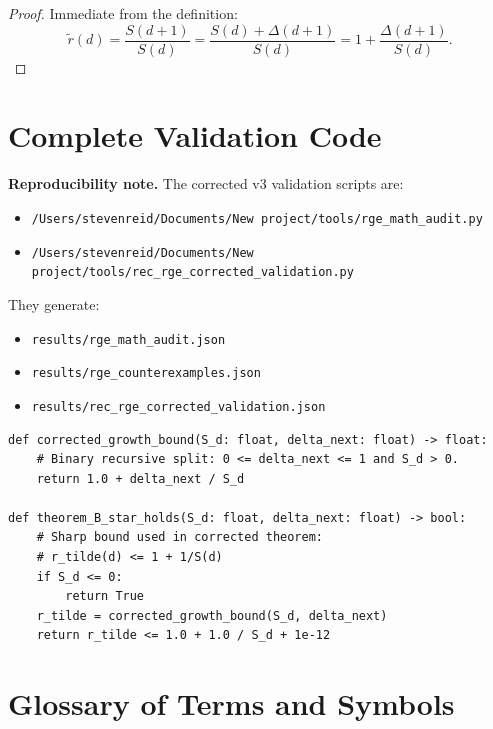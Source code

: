 \documentclass[11pt,a4paper]{article}
\theoremstyle{definition}
\theoremstyle{remark}
\newcommand{\rtilde}{\tilde{r}}
\begin{document}
\begin{proof}
Immediate from the definition:
\begin{equation}
    \rtilde(d)=\frac{S(d+1)}{S(d)}=\frac{S(d)+\Delta(d+1)}{S(d)}
    =1+\frac{\Delta(d+1)}{S(d)}.
\end{equation}
\end{proof}

\section{Complete Validation Code}
\label{app:code}

\noindent\textbf{Reproducibility note.} The corrected v3 validation scripts are:
\begin{itemize}[nosep]
    \item \texttt{/Users/stevenreid/Documents/New project/tools/rge\_math\_audit.py}
    \item \texttt{/Users/stevenreid/Documents/New project/tools/rec\_rge\_corrected\_validation.py}
\end{itemize}

They generate:
\begin{itemize}[nosep]
    \item \texttt{results/rge\_math\_audit.json}
    \item \texttt{results/rge\_counterexamples.json}
    \item \texttt{results/rec\_rge\_corrected\_validation.json}
\end{itemize}

\begin{lstlisting}[style=python, caption={Minimal corrected validation core (v3)}]
def corrected_growth_bound(S_d: float, delta_next: float) -> float:
    # Binary recursive split: 0 <= delta_next <= 1 and S_d > 0.
    return 1.0 + delta_next / S_d

def theorem_B_star_holds(S_d: float, delta_next: float) -> bool:
    # Sharp bound used in corrected theorem:
    # r_tilde(d) <= 1 + 1/S(d)
    if S_d <= 0:
        return True
    r_tilde = corrected_growth_bound(S_d, delta_next)
    return r_tilde <= 1.0 + 1.0 / S_d + 1e-12
\end{lstlisting}

\section{Glossary of Terms and Symbols}
\label{app:glossary}
\end{document}

